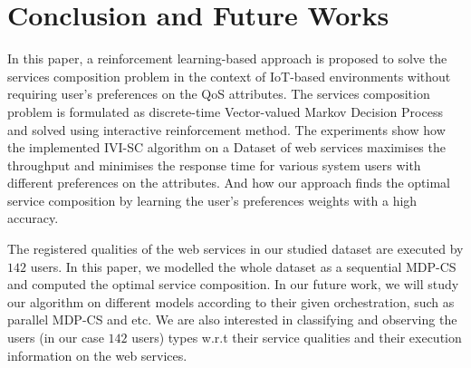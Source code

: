 \documentclass[10pt,journal,compsoc]{IEEEtran}
\begin{document}
%


\section{Conclusion and Future Works} \label{sec:Concl-Futwork}

In this paper, a reinforcement learning-based approach is proposed to solve the services composition problem in the context of IoT-based environments without requiring user's preferences on the QoS attributes. The services composition problem is formulated as discrete-time Vector-valued Markov Decision Process and solved using interactive reinforcement method. The experiments show how the implemented IVI-SC algorithm on a Dataset\cite{Zheng2014} of web services maximises the throughput and minimises the response time for various system users with different preferences on the attributes. And how our approach finds the optimal service composition by learning the user's preferences weights with a high accuracy. 

The registered qualities of the web services in our studied dataset\cite{Zheng2015,Zheng2014} are executed by $142$ users. In this paper, we modelled the whole dataset as a sequential MDP-CS and computed the optimal service composition. In our future work, we will study our algorithm on different models according to their given orchestration, such as parallel MDP-CS and etc. We are also interested in classifying and observing the users (in our case $142$ users) types w.r.t their service qualities and their execution information on the web services.


\IEEEpeerreviewmaketitle

\ifCLASSOPTIONcompsoc
    
\end{document}
